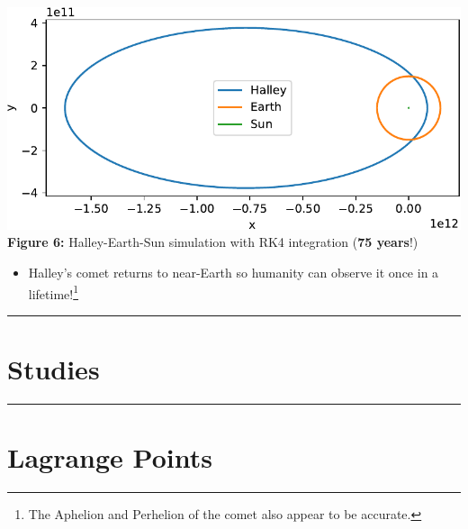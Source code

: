 \documentclass[11pt]{article}
\newcommand{\psection}[1]{{
    \begin{center}
        \noindent \rule{17cm}{0.4pt}
        \section*{\LARGE #1}
        \noindent \rule{17cm}{0.4pt}
    \end{center}
}}
\newcommand{\psubsection}[1]{{\section*{\LARGE #1}}}
\begin{document}
    \begin{center}
        \includegraphics[scale = 1.1]{images/halley-crop}
        \\ \caption{\textbf{Figure 6:} Halley-Earth-Sun simulation with RK4 integration (\textbf{75 years}!)}
        \label{fig:fig6}
    \end{center}

    \begin{itemize}
        \item Halley's comet returns to near-Earth so humanity can observe it once in a lifetime!\footnote{The Aphelion and Perhelion of the comet also appear to be accurate.}
    \end{itemize}

    \newpage

    \psection{Studies}
    
    \psubsection{Lagrange Points}
\end{document}
